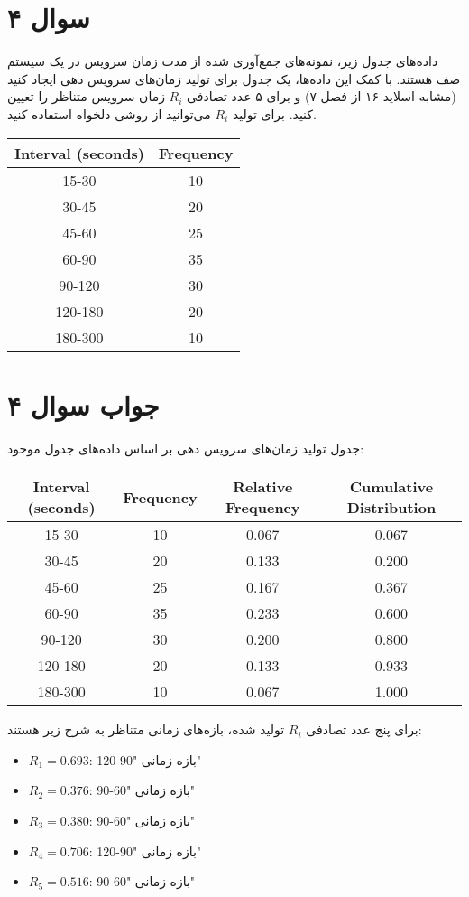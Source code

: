 \section*{سوال ۴}
	
داده‌های جدول زیر، نمونه‌های جمع‌آوری شده از مدت زمان سرویس در یک سیستم صف هستند. با کمک این داده‌ها، یک جدول برای تولید زمان‌های سرویس دهی ایجاد کنید (مشابه اسلاید ۱۶ از فصل ۷) و برای ۵ عدد تصادفی \( R_i \) زمان سرویس متناظر را تعیین کنید. برای تولید \( R_i \) می‌توانید از روشی دلخواه استفاده کنید.

\begin{center}
	\begin{tabular}{ |c|c| }
		\hline
		Interval (seconds) & Frequency \\
		\hline
		15-30 & 10 \\
		30-45 & 20 \\
		45-60 & 25 \\
		60-90 & 35 \\
		90-120 & 30 \\
		120-180 & 20 \\
		180-300 & 10 \\
		\hline
	\end{tabular}
\end{center}

\section*{جواب سوال ۴}

جدول تولید زمان‌های سرویس دهی بر اساس داده‌های جدول موجود:

\begin{center}
	\begin{tabular}{ |c|c|c|c| }
		\hline
		Interval (seconds) & Frequency & Relative Frequency & Cumulative Distribution \\
		\hline
		15-30 & 10 & 0.067 & 0.067 \\
		30-45 & 20 & 0.133 & 0.200 \\
		45-60 & 25 & 0.167 & 0.367 \\
		60-90 & 35 & 0.233 & 0.600 \\
		90-120 & 30 & 0.200 & 0.800 \\
		120-180 & 20 & 0.133 & 0.933 \\
		180-300 & 10 & 0.067 & 1.000 \\
		\hline
	\end{tabular}
\end{center}

برای پنج عدد تصادفی \( R_i \) تولید شده، بازه‌های زمانی متناظر به شرح زیر هستند:

\begin{itemize}
	\item \( R_1 = 0.693 \): بازه زمانی "90-120"
	\item \( R_2 = 0.376 \): بازه زمانی "60-90"
	\item \( R_3 = 0.380 \): بازه زمانی "60-90"
	\item \( R_4 = 0.706 \): بازه زمانی "90-120"
	\item \( R_5 = 0.516 \): بازه زمانی "60-90"
\end{itemize}

